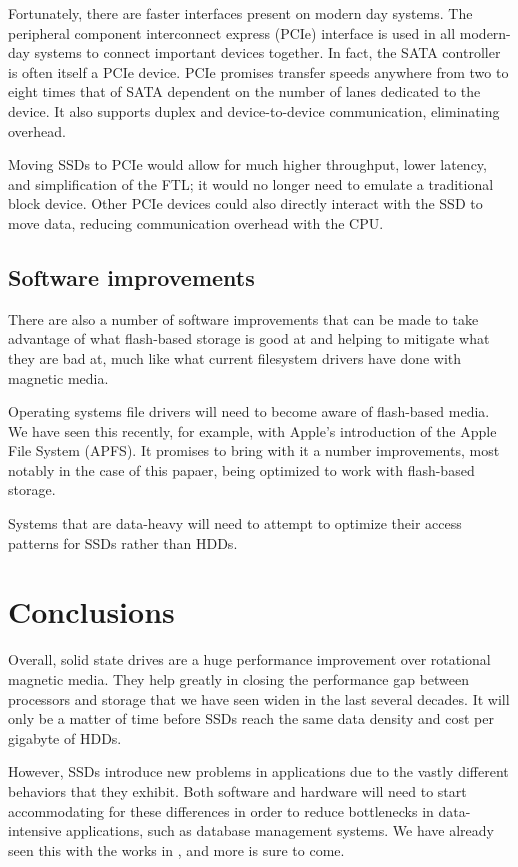 \documentclass[format=acmsmall, review=false, screen=true]{acmart}
\begin{document}
Fortunately, there are faster interfaces present on modern day systems. The peripheral component interconnect express 
(PCIe) interface is used in all modern-day systems to connect important devices together. In fact, the SATA controller 
is often itself a PCIe device. PCIe promises transfer speeds anywhere from two to eight times that of SATA dependent on 
the number of lanes dedicated to the device. It also supports duplex and device-to-device communication, eliminating 
overhead. \cite{Micheloni2013}

Moving SSDs to PCIe would allow for much higher throughput, lower latency, and simplification of the FTL; it would no 
longer need to emulate a traditional block device. Other PCIe devices could also directly interact with the SSD to move 
data, reducing communication overhead with the CPU. \cite{Micheloni2013}

\subsection{Software improvements}

There are also a number of software improvements that can be made to take advantage of what flash-based storage is good 
at and helping to mitigate what they are bad at, much like what current filesystem drivers have done with magnetic media.

Operating systems file drivers will need to become aware of flash-based media. We have seen this recently, for example, 
with Apple's introduction of the Apple File System (APFS). It promises to bring with it a number improvements, most notably
in the case of this papaer, being optimized to work with flash-based storage. \cite{AppleComputer2017}

Systems that are data-heavy will need to attempt to optimize their access patterns for SSDs rather than HDDs. 

\section{Conclusions}

Overall, solid state drives are a huge performance improvement over rotational magnetic media. They help greatly in closing 
the performance gap between processors and storage that we have seen widen in the last several decades. It will only be a 
matter of time before SSDs reach the same data density and cost per gigabyte of HDDs. \cite{Chen2016}

However, SSDs introduce new problems in applications due to the vastly different behaviors that they exhibit. Both software 
and hardware will need to start accommodating for these differences in order to reduce bottlenecks in data-intensive 
applications, such as database management systems. We have already seen this with the works in \cite{AppleComputer2017}, 
and more is sure to come.



\end{document}
